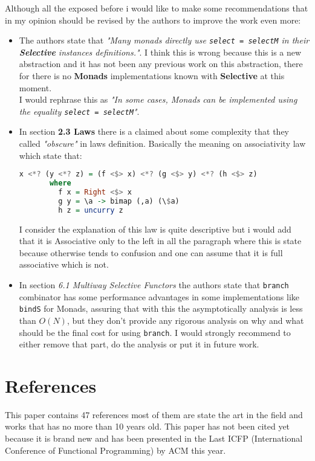 \documentclass[12pt, a4paper]{article}
\begin{document}
Although all the exposed before i would like to make some recommendations that
in my opinion should be revised by the authors to improve the work even more:

\begin{itemize}
 \item The authors state that \textit{"Many monads directly use
     \lstinline{select = selectM} in their \textbf{Selective} instances
     definitions."}. I think this is wrong because this is a new
   abstraction and it has not been any previous work on this abstraction, there
   for there is no \textbf{Monads} implementations known with \textbf{Selective}
   at this moment.\\
   I would rephrase this as \textit{"In some cases, Monads can be implemented
     using the equality \lstinline{select = selectM}"}.
 \item In section \textbf{2.3 Laws} there is a claimed about some complexity
   that they called \textit{"obscure"} in laws definition. Basically the meaning
   on associativity law which state that:

   \begin{lstlisting}[language=Haskell,label={ass}]
     x <*? (y <*? z) = (f <$> x) <*? (g <$> y) <*? (h <$> z)
       where
         f x = Right <$> x
         g y = \a -> bimap (,a) (\$a)
         h z = uncurry z
   \end{lstlisting}

   I consider the explanation of this law is quite descriptive but i would add
   that it is Associative only to the left in all the paragraph where this is
   state because otherwise tends to confusion and one can assume that it is full
   associative which is not.

\item In section \textit{6.1 Multiway Selective Functors} the authors state
     that \lstinline{branch} combinator has some performance advantages in some
     implementations like \lstinline{bindS} for Monads, assuring that with this
     the asymptotically analysis is less than $O(N)$, but they don't provide any
     rigorous analysis on why and what should be the final cost for using
     \lstinline{branch}. I would strongly recommend to either remove that part,
     do the analysis or put it in future work.
     
\end{itemize}

\section{References}
This paper contains 47 references most of them are state the art in the field
and works that has no more than 10 years old.
This paper has not been cited yet because it is brand new and has been
presented in the Last ICFP (International Conference of Functional Programming)
by ACM this year.
\end{document}

